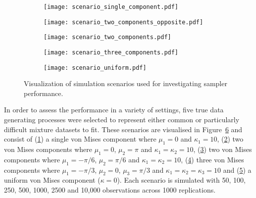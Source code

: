 \begin{figure}
	\captionsetup[subfigure]{justification=centering}
	\centering
	\begin{subfigure}[b]{0.18\textwidth}
		\texttt{[image: scenario\_single\_component.pdf]}
		\caption{}
		\label{fig:simulation-scenarios:single}
	\end{subfigure}
	\begin{subfigure}[b]{0.18\textwidth}
		\texttt{[image: scenario\_two\_components\_opposite.pdf]}
		\caption{}
		\label{fig:simulation-scenarios:two-opposite}
	\end{subfigure}
	\begin{subfigure}[b]{0.18\textwidth}
		\texttt{[image: scenario\_two\_components.pdf]}
		\caption{}
		\label{fig:simulation-scenarios:two}
	\end{subfigure}
	\begin{subfigure}[b]{0.18\textwidth}
		\texttt{[image: scenario\_three\_components.pdf]}
		\caption{}
		\label{fig:simulation-scenarios:three}
	\end{subfigure}
	\begin{subfigure}[b]{0.18\textwidth}
		\texttt{[image: scenario\_uniform.pdf]}
		\caption{}
		\label{fig:simulation-scenarios:uniform}
	\end{subfigure}
	\caption{Visualization of simulation scenarios used for investigating sampler performance.}
	\label{fig:simulation-scenarios}
\end{figure}

In order to assess the performance in a variety of settings, five true data generating processes were selected to represent either common or particularly difficult mixture datasets to fit. These scenarios are visualised in Figure~\ref{fig:simulation-scenarios} and consist of (\ref{fig:simulation-scenarios:single}) a single von Mises component where $\mu_1 = 0$ and $\kappa_1 = 10$, (\ref{fig:simulation-scenarios:two-opposite}) two von Mises components where $\mu_1 = 0$, $\mu_2 = \pi$ and $\kappa_1 = \kappa_2 = 10$, (\ref{fig:simulation-scenarios:two}) two von Mises components where $\mu_1 = -\pi/6$, $\mu_2 = \pi/6$ and $\kappa_1 = \kappa_2 = 10$, (\ref{fig:simulation-scenarios:three}) three von Mises components where $\mu_1 = -\pi/3$, $\mu_2 = 0$, $\mu_3 = \pi/3$ and $\kappa_1 = \kappa_2 = \kappa_3 = 10$ and (\ref{fig:simulation-scenarios:uniform}) a uniform von Mises component ($\kappa = 0$). Each scenario is simulated with 50, 100, 250, 500, 1000, 2500 and 10,000 observations across 1000 replications.

